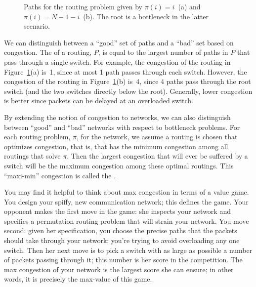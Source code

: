 \begin{figure}


\qquad
{}

\caption{Paths for the routing problem given by $\pi(i) = i$~(a) and
  $\pi(i) = N - 1 - i$~(b).  The root is a bottleneck in the latter
  scenario.}

\label{fig:6EJ}

\end{figure}

We can distinguish between a ``good'' set of paths and a ``bad'' set
based on congestion.  The  of a routing, $P$, is
equal to the largest number of paths in $P$ that pass through a single
switch.  For example, the congestion of the routing in
Figure~\ref{fig:6EJ}(a) is~1, since at most 1 path passes through each
switch.  However, the congestion of the routing in
Figure~\ref{fig:6EJ}(b) is~4, since 4 paths pass through the root
switch (and the two switches directly below the root).  Generally,
lower congestion is better since packets can be delayed at an
overloaded switch.

By extending the notion of congestion to networks, we can also distinguish
between ``good'' and ``bad'' networks with respect to bottleneck problems.
For each routing problem, $\pi$, for the network, we assume a routing is
chosen that optimizes congestion, that is, that has the minimum congestion
among all routings that solve $\pi$.  Then the largest congestion that
will ever be suffered by a switch will be the maximum congestion among
these optimal routings.  This ``maxi-min'' congestion is called the
.

You may find it helpful to think about max congestion in terms of a
value game.  You design your spiffy, new communication network; this
defines the game.  Your opponent makes the first move in the game: she
inspects your network and specifies a permutation routing problem that
will strain your network.  You move second: given her specification,
you choose the precise paths that the packets should take through your
network; you're trying to avoid overloading any one switch.  Then her
next move is to pick a switch with as large as possible a number of
packets passing through it; this number is her score in the
competition.  The max congestion of your network is the largest score
she can ensure; in other words, it is precisely the max-value of this
game.


